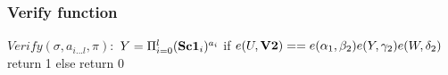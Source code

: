 \subsubsection{Verify function}
\underline{$Verify(\sigma, a_{i...l}, \pi) :$}
\tabNormal $Y=\Pi_{i=0}^{l}(\textbf{Sc1}_i)^{a_i}$
\tabNormal if $e(U,\textbf{V2}) == e(\textbf{$\alpha_1$}, \textbf{$\beta_2$}) e(Y, \textbf{$\gamma_2$})  e(W, \textbf{$\delta_2$}) $ 
\tabOne return 1
\tabNormal else 
\tabOne return 0